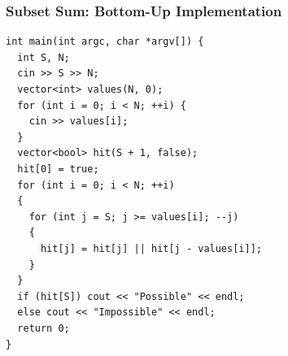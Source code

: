 \documentclass{beamer}
\newcounter{exo}
\newcommand{\exo}{
  \addtocounter{exo}{1}
  Exercice \arabic{exo}
}
\begin{document}
\begin{frame}[containsverbatim]
\frametitle{Subset Sum: Bottom-Up Implementation}

\scriptsize
\begin{lstlisting}
int main(int argc, char *argv[]) {
  int S, N;
  cin >> S >> N;
  vector<int> values(N, 0);
  for (int i = 0; i < N; ++i) {
    cin >> values[i];
  }
  vector<bool> hit(S + 1, false);
  hit[0] = true;
  for (int i = 0; i < N; ++i)
  {
    for (int j = S; j >= values[i]; --j)
    {
      hit[j] = hit[j] || hit[j - values[i]];
    }
  }
  if (hit[S]) cout << "Possible" << endl;
  else cout << "Impossible" << endl;
  return 0;
}
\end{lstlisting}

\end{frame}


\ifanswers
\end{document}
